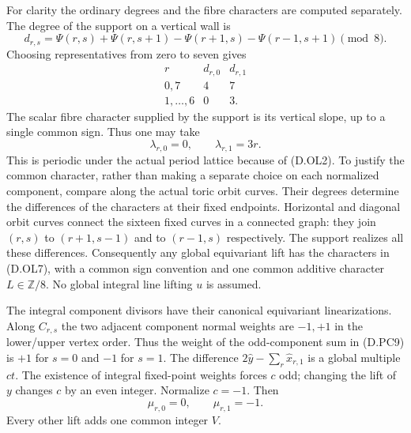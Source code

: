 For clarity the ordinary degrees and the fibre characters are
computed separately. The degree of the support on a vertical wall is
\[
 d_{r,s}=\Psi(r,s)+\Psi(r,s+1)
              -\Psi(r+1,s)-\Psi(r-1,s+1)\pmod8 .         \tag{D.OL5}
\]
Choosing representatives from zero to seven gives
\[
\begin{array}{c|cc}
 r&d_{r,0}&d_{r,1}\\\hline
 0,7&4&7\\
 1,\ldots,6&0&3.
\end{array}                                                \tag{D.OL6}
\]
The scalar fibre character supplied by the support is its vertical
slope, up to a single common sign. Thus one may take
\[
                 \lambda_{r,0}=0,\qquad
                 \lambda_{r,1}=3r .                      \tag{D.OL7}
\]
This is periodic under the actual period lattice because of
(D.OL2). To justify the common character, rather than making a
separate choice on each normalized component, compare along the
actual toric orbit curves. Their degrees determine the differences
of the characters at their fixed endpoints. Horizontal and diagonal
orbit curves connect the sixteen fixed curves in a connected graph:
they join $(r,s)$ to $(r+1,s-1)$ and to $(r-1,s)$ respectively.
The support realizes all these differences. Consequently any global
equivariant lift has the characters in (D.OL7), with a common sign
convention and one common additive character $L\in\mathbb Z/8$.
No global integral line lifting $u$ is assumed.

The integral component divisors have their canonical equivariant
linearizations. Along $C_{r,s}$ the two adjacent component normal
weights are $-1,+1$ in the lower/upper vertex order. Thus the weight
of the odd-component sum in (D.PC9) is $+1$ for $s=0$ and $-1$
for $s=1$. The difference
$2\widehat y-\sum_r\widehat x_{r,1}$ is a global multiple $ct$.
The existence of integral fixed-point weights forces $c$ odd;
changing the lift of $y$ changes $c$ by an even integer. Normalize
$c=-1$. Then
\[
                       \mu_{r,0}=0,\qquad
                       \mu_{r,1}=-1.                     \tag{D.OL8}
\]
Every other lift adds one common integer $V$.

